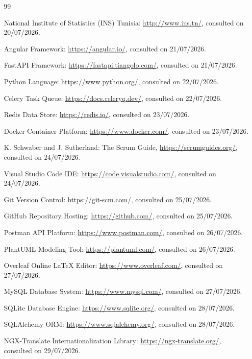 \documentclass[12pt,a4paper]{report}
\begin{document}
\clearpage
{}
\begin{thebibliography}{99}

 National Institute of Statistics (INS) Tunisia: \url{http://www.ins.tn/}, consulted on 20/07/2026.

 Angular Framework: \url{https://angular.io/}, consulted on 21/07/2026.

 FastAPI Framework: \url{https://fastapi.tiangolo.com/}, consulted on 21/07/2026.

 Python Language: \url{https://www.python.org/}, consulted on 22/07/2026.

 Celery Task Queue: \url{https://docs.celeryq.dev/}, consulted on 22/07/2026.

 Redis Data Store: \url{https://redis.io/}, consulted on 23/07/2026.

 Docker Container Platform: \url{https://www.docker.com/}, consulted on 23/07/2026.

 K. Schwaber and J. Sutherland: The Scrum Guide, \url{https://scrumguides.org/}, consulted on 24/07/2026.

 Visual Studio Code IDE: \url{https://code.visualstudio.com/}, consulted on 24/07/2026.

 Git Version Control: \url{https://git-scm.com/}, consulted on 25/07/2026.

 GitHub Repository Hosting: \url{https://github.com/}, consulted on 25/07/2026.

 Postman API Platform: \url{https://www.postman.com/}, consulted on 26/07/2026.

 PlantUML Modeling Tool: \url{https://plantuml.com/}, consulted on 26/07/2026.

 Overleaf Online LaTeX Editor: \url{https://www.overleaf.com/}, consulted on 27/07/2026.

 MySQL Database System: \url{https://www.mysql.com/}, consulted on 27/07/2026.

 SQLite Database Engine: \url{https://www.sqlite.org/}, consulted on 28/07/2026.

 SQLAlchemy ORM: \url{https://www.sqlalchemy.org/}, consulted on 28/07/2026.

 NGX-Translate Internationalization Library: \url{https://ngx-translate.org/}, consulted on 29/07/2026.


\end{thebibliography}
\end{document}
